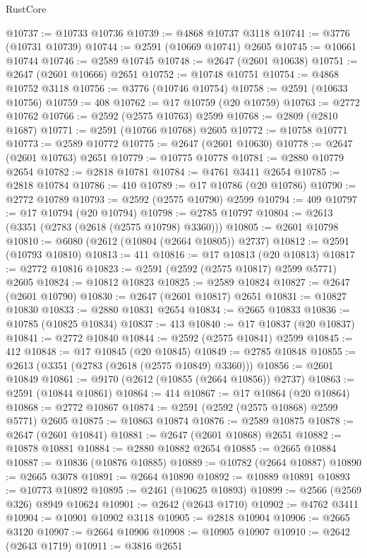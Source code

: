 \begin{lexlean}{RustCore}
\begin{coremodule}
@10737 := @10733 @10736
@10739 := @4868 @10737 @3118
@10741 := @3776 (@10731 @10739)
@10744 := @2591 (@10669 @10741) @2605
@10745 := @10661 @10744
@10746 := @2589 @10745
@10748 := @2647 (@2601 @10638)
@10751 := @2647 (@2601 @10666) @2651
@10752 := @10748 @10751
@10754 := @4868 @10752 @3118
@10756 := @3776 (@10746 @10754)
@10758 := @2591 (@10633 @10756)
@10759 := 408
@10762 := @17 @10759 (@20 @10759)
@10763 := @2772 @10762
@10766 := @2592 (@2575 @10763) @2599
@10768 := @2809 (@2810 @1687)
@10771 := @2591 (@10766 @10768) @2605
@10772 := @10758 @10771
@10773 := @2589 @10772
@10775 := @2647 (@2601 @10630)
@10778 := @2647 (@2601 @10763) @2651
@10779 := @10775 @10778
@10781 := @2880 @10779 @2654
@10782 := @2818 @10781
@10784 := @4761 @3411 @2654
@10785 := @2818 @10784
@10786 := 410
@10789 := @17 @10786 (@20 @10786)
@10790 := @2772 @10789
@10793 := @2592 (@2575 @10790) @2599
@10794 := 409
@10797 := @17 @10794 (@20 @10794)
@10798 := @2785 @10797
@10804 := @2613 (@3351 (@2783 (@2618 (@2575 @10798) @3360)))
@10805 := @2601 @10798
@10810 := @6080 (@2612 (@10804 (@2664 @10805)) @2737)
@10812 := @2591 (@10793 @10810)
@10813 := 411
@10816 := @17 @10813 (@20 @10813)
@10817 := @2772 @10816
@10823 := @2591 (@2592 (@2575 @10817) @2599 @5771) @2605
@10824 := @10812 @10823
@10825 := @2589 @10824
@10827 := @2647 (@2601 @10790)
@10830 := @2647 (@2601 @10817) @2651
@10831 := @10827 @10830
@10833 := @2880 @10831 @2654
@10834 := @2665 @10833
@10836 := @10785 (@10825 @10834)
@10837 := 413
@10840 := @17 @10837 (@20 @10837)
@10841 := @2772 @10840
@10844 := @2592 (@2575 @10841) @2599
@10845 := 412
@10848 := @17 @10845 (@20 @10845)
@10849 := @2785 @10848
@10855 := @2613 (@3351 (@2783 (@2618 (@2575 @10849) @3360)))
@10856 := @2601 @10849
@10861 := @9170 (@2612 (@10855 (@2664 @10856)) @2737)
@10863 := @2591 (@10844 @10861)
@10864 := 414
@10867 := @17 @10864 (@20 @10864)
@10868 := @2772 @10867
@10874 := @2591 (@2592 (@2575 @10868) @2599 @5771) @2605
@10875 := @10863 @10874
@10876 := @2589 @10875
@10878 := @2647 (@2601 @10841)
@10881 := @2647 (@2601 @10868) @2651
@10882 := @10878 @10881
@10884 := @2880 @10882 @2654
@10885 := @2665 @10884
@10887 := @10836 (@10876 @10885)
@10889 := @10782 (@2664 @10887)
@10890 := @2665 @3078
@10891 := @2664 @10890
@10892 := @10889 @10891
@10893 := @10773 @10892
@10895 := @2461 (@10625 @10893)
@10899 := @2566 (@2569 @326) @8949 @10624
@10901 := @2642 (@2643 @1710)
@10902 := @4762 @3411
@10904 := @10901 @10902 @3118
@10905 := @2818 @10904
@10906 := @2665 @3120
@10907 := @2664 @10906
@10908 := @10905 @10907
@10910 := @2642 (@2643 @1719)
@10911 := @3816 @2651

\end{coremodule}
\end{lexlean}
